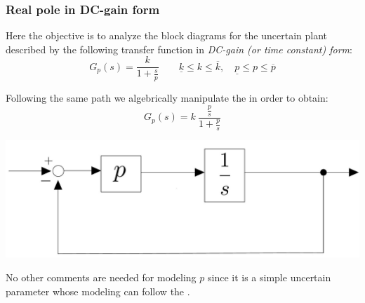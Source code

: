 \documentclass[a4paper, 12pt]{article}
\begin{document}
\subsubsection{Real pole in DC-gain form}
Here the objective is to analyze the block diagrams for the uncertain plant described by the following transfer function in \textit{DC-gain (or time constant) form}:
\begin{equation}\label{eq:ex2}
    G_p(s)=\frac{k}{1+\frac{s}{p}} \qquad
    \underline{k}\le {k} \le \overline{k}, \quad
    \underline{p}\le {p} \le \overline{p}
\end{equation}
\noindent

\begin{multicols}{2}
    \noindent
    Following the same path we algebrically manipulate the  in order to obtain:
    \begin{equation*}
        G_p(s)=k \ \frac{\frac{p}{s}}{1+\frac{p}{s}}
    \end{equation*}
    \newcolumn
    \begin{center}
        \includegraphics[scale=0.15]{img/ex2.jpg}
    \end{center}
\end{multicols}
\noindent
No other comments are needed  for modeling $p$ since it is a simple uncertain parameter whose modeling can follow the .
\end{document}
